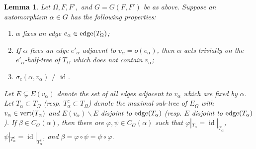 \documentclass[12pt]{amsart}
\newtheorem{lem}[theorem]{Lemma}
\theoremstyle{definition}
\theoremstyle{remark}
\newcommand{\id}{\operatorname{id}}
\begin{document}
\begin{lem}\label{amenable trees moves}
Let $\Omega, F, F',$ and $G = G(F, F')$ be as above. Suppose an automorphism $\alpha\in G$ has the following properties:
\begin{enumerate}
    \item $\alpha$ fixes an edge $e_{\alpha}\in \textup{edge}(T_{\Omega})$;
    \item If $\alpha$ fixes an edge $e'_{\alpha}$ adjacent to $v_{\alpha} = o(e_{\alpha})$, then $\alpha$ acts trivially on the $e'_{\alpha}$-half-tree of $T_{\Omega}$ which does not contain $v_{\alpha}$;
    \item $\sigma_c(\alpha, v_{\alpha})\neq \id$.
\end{enumerate}
Let $E\subsetneq E(v_{\alpha})$ denote the set of all edges adjacent to $v_{\alpha}$ which are fixed by $\alpha$. Let $T_\alpha\subset T_{\Omega}$ \textup{(}resp. $T_{\alpha}^c\subset T_{\Omega}$\textup{)} denote the maximal sub-tree of $E_{\Omega}$ with $v_{\alpha}\in \textup{vert}(T_{\alpha})$ and $E(v_{\alpha})\backslash E$ disjoint to $\textup{edge}(T_{\alpha})$ \textup{(}resp. $E$ disjoint to $\textup{edge}(T_{\alpha})$\textup{)}.
If $\beta \in C_G(\alpha)$, then there are $\varphi,\psi \in C_G(\alpha)$ such that $\varphi|_{T_\alpha} = \id|_{T_\alpha}$, $\psi|_{T_\alpha^c} = \id|_{T_\alpha^c}$, and $\beta = \varphi \circ \psi = \psi \circ \varphi$.
\end{lem}
\end{document}
